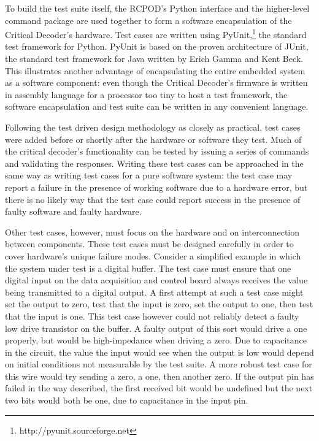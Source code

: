 \documentclass[letterpaper,twocolumn]{article}
\begin{document}
To build the test suite itself, the RCPOD's Python interface and the higher-level command package are
used together to form a software encapsulation of the Critical Decoder's hardware. Test cases are written
using PyUnit,\footnote{http://pyunit.sourceforge.net} the standard test framework for Python. PyUnit is based
on the proven architecture of JUnit, the standard test framework for Java written by Erich Gamma and Kent Beck.
This illustrates another advantage of encapsulating the entire embedded system as a software component: even
though the Critical Decoder's firmware is written in assembly language for a processor too tiny to host a
test framework, the software encapsulation and test suite can be written in any convenient language.

Following the test driven design methodology as closely as practical, test cases were added before or shortly
after the hardware or software they test. Much of the critical decoder's functionality can be tested by issuing
a series of commands and validating the responses. Writing these test cases can be approached in the same way
as writing test cases for a pure software system: the test case may report a failure in the presence of working
software due to a hardware error, but there is no likely way that the test case could report success in the
presence of faulty software and faulty hardware.

Other test cases, however, must focus on the hardware and on interconnection between components. These test
cases must be designed carefully in order to cover hardware's unique failure modes. Consider a simplified
example in which the system under test is a digital buffer. The test case must ensure that one
digital input on the data acquisition and control board always receives the value being transmitted to a
digital output. A first attempt at such a test case might set the output to zero, test that the input is
zero, set the output to one, then test that the input is one. This test case however
could not reliably detect a faulty low drive transistor on
the buffer. A faulty output of this sort would drive a one properly, but would be high-impedance when
driving a zero. Due to capacitance in the circuit, the value the input would see when the output is low would
depend on initial conditions not measurable by the test suite. A more robust test case for this wire would try
sending a zero, a one, then another zero. If the output pin has failed in the way described, the first
received bit would be undefined but the next two bits would both be one, due to capacitance in the input pin.
\end{document}
